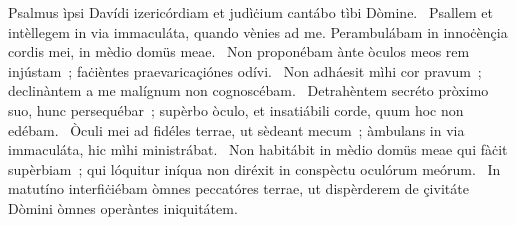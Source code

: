 { Psalmus ìpsi Davídi}
{%
izericórdiam et judìċium cantábo tìbi Dòmine. 
~Psallem et intèllegem in via immaculáta, quando vènies ad me. Perambulábam in innoċènçia cordis mei, in mèdio domüs meae. 
~Non proponébam ànte òculos meos rem injústam~; faċièntes praevaricaçiónes odívi. 
~Non adháesit mìhi cor pravum~; declinàntem a me malígnum non cognoscébam. 
~Detrahèntem secréto pròximo suo, hunc persequébar~; supèrbo òculo, et insatiábili corde, quum hoc non edébam. 
~Òculi mei ad fidéles terrae, ut sèdeant mecum~; àmbulans in via immaculáta, hic mìhi ministrábat. 
~Non habitábit in mèdio domüs meae qui fàċit supèrbiam~; qui lóquitur iníqua non diréxit in conspèctu oculórum meórum. 
~In matutíno interfiċiébam òmnes peccatóres terrae, ut dispèrderem de çivitáte Dòmini òmnes operàntes iniquitátem. 
}
